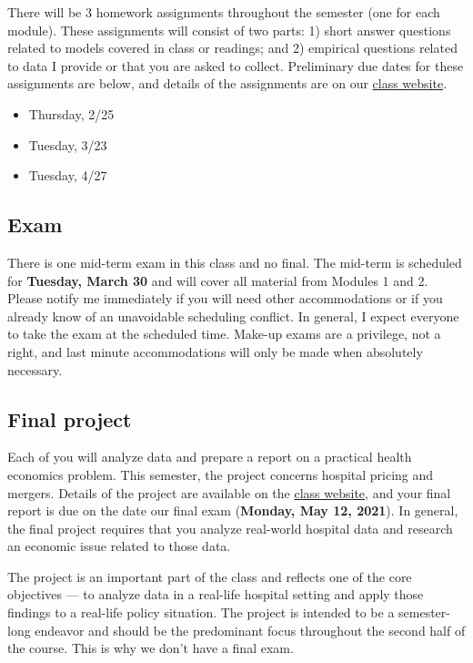 \documentclass[11pt,]{article}
\providecommand{\tightlist}{%
  \setlength{\itemsep}{0pt}\setlength{\parskip}{0pt}}
\begin{document}
There will be 3 homework assignments throughout the semester (one for
each module). These assignments will consist of two parts: 1) short
answer questions related to models covered in class or readings; and 2)
empirical questions related to data I provide or that you are asked to
collect. Preliminary due dates for these assignments are below, and
details of the assignments are on our
\href{https://mccarthy-spring21-econ372.netlify.app/}{class website}.

\begin{itemize}
\tightlist
\item
  Thursday, 2/25
\item
  Tuesday, 3/23
\item
  Tuesday, 4/27
\end{itemize}

\hypertarget{exam}{%
\subsection{Exam}\label{exam}}

There is one mid-term exam in this class and no final. The mid-term is
scheduled for \textbf{Tuesday, March 30} and will cover all material
from Modules 1 and 2. Please notify me immediately if you will need
other accommodations or if you already know of an unavoidable scheduling
conflict. In general, I expect everyone to take the exam at the
scheduled time. Make-up exams are a privilege, not a right, and last
minute accommodations will only be made when absolutely necessary.

\hypertarget{final-project}{%
\subsection{Final project}\label{final-project}}

Each of you will analyze data and prepare a report on a practical health
economics problem. This semester, the project concerns hospital pricing
and mergers. Details of the project are available on the
\href{https://mccarthy-spring21-econ372.netlify.app/}{class website},
and your final report is due on the date our final exam (\textbf{Monday,
May 12, 2021}). In general, the final project requires that you analyze
real-world hospital data and research an economic issue related to those
data.

The project is an important part of the class and reflects one of the
core objectives --- to analyze data in a real-life hospital setting and
apply those findings to a real-life policy situation. The project is
intended to be a semester-long endeavor and should be the predominant
focus throughout the second half of the course. This is why we don't
have a final exam.
\end{document}
